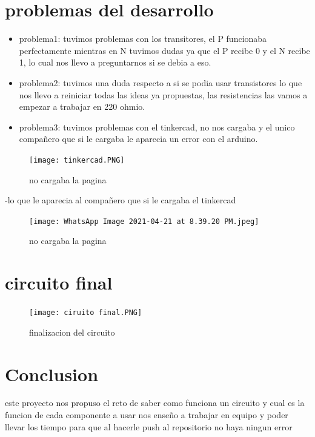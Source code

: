 \documentclass{article}
\begin{document}
\section{problemas del desarrollo}
\begin{itemize}
\item problema1: tuvimos problemas con los transitores, el P funcionaba perfectamente mientras en N tuvimos dudas ya que el P recibe 0 y el N recibe 1, lo cual nos llevo a preguntarnos si se debia a eso.
\item problema2: tuvimos una duda respecto a si se podia usar transistores lo que nos llevo a reiniciar todas las ideas ya propuestas, las resistencias las vamos a empezar a trabajar en 220 ohmio.
\item problema3: tuvimos problemas con el tinkercad, no nos cargaba y el unico compañero que si le cargaba le aparecia un error con el arduino.
\end{itemize}
\begin{figure}[h!]
\centering
\texttt{[image: tinkercad.PNG]}
\caption{no cargaba la pagina}
\label{fig:universe}
\end{figure}
-lo que le aparecia al compañero que si le cargaba el tinkercad
\begin{figure}[h!]
\centering
\texttt{[image: WhatsApp Image 2021-04-21 at 8.39.20 PM.jpeg]}
\caption{no cargaba la pagina}
\label{fig:universe}
\end{figure}
\section{circuito final}
\begin{figure}[h!]
\centering
\texttt{[image: ciruito final.PNG]}
\caption{finalizacion del circuito}
\label{fig:universe}
\end{figure}
\section{Conclusion}
este proyecto nos propuso el reto de saber como funciona un circuito y cual es la funcion de cada componente a usar
nos enseño a trabajar en equipo y poder llevar los tiempo para que al hacerle push al repositorio no haya ningun error


\end{document}
